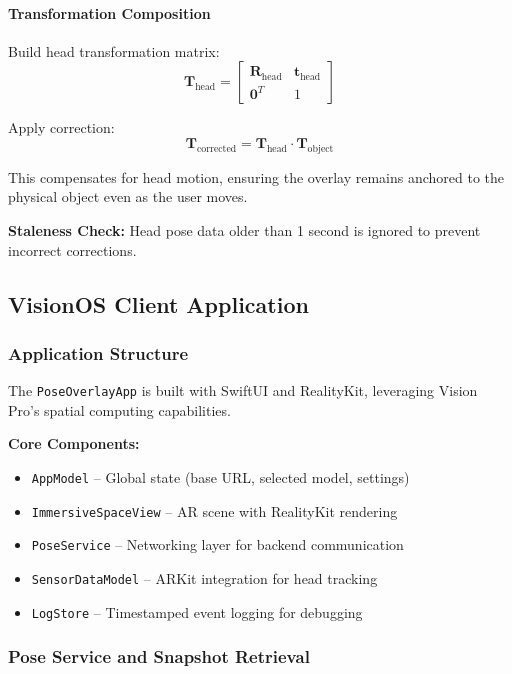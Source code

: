 \paragraph{Transformation Composition}

Build head transformation matrix:
\[
\mathbf{T}_{\text{head}} = \begin{bmatrix}
\mathbf{R}_{\text{head}} & \mathbf{t}_{\text{head}} \\
\mathbf{0}^T & 1
\end{bmatrix}
\]

Apply correction:
\[
\mathbf{T}_{\text{corrected}} = \mathbf{T}_{\text{head}} \cdot \mathbf{T}_{\text{object}}
\]

This compensates for head motion, ensuring the overlay remains anchored to the physical object even as the user moves.

\textbf{Staleness Check:} Head pose data older than 1 second is ignored to prevent incorrect corrections.

\subsection{VisionOS Client Application}

\subsubsection{Application Structure}

The \texttt{PoseOverlayApp} is built with SwiftUI and RealityKit, leveraging Vision Pro's spatial computing capabilities.

\textbf{Core Components:}
\begin{itemize}
    \item \texttt{AppModel} -- Global state (base URL, selected model, settings)
    \item \texttt{ImmersiveSpaceView} -- AR scene with RealityKit rendering
    \item \texttt{PoseService} -- Networking layer for backend communication
    \item \texttt{SensorDataModel} -- ARKit integration for head tracking
    \item \texttt{LogStore} -- Timestamped event logging for debugging
\end{itemize}

\subsubsection{Pose Service and Snapshot Retrieval}

